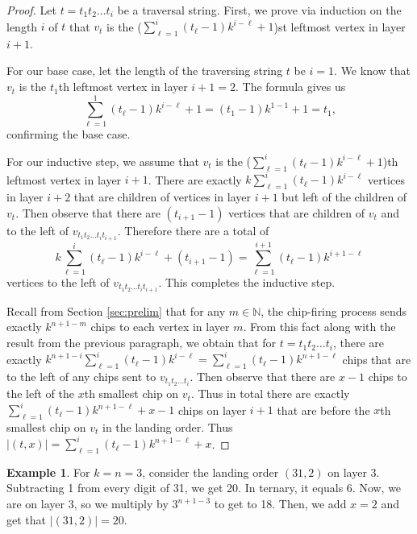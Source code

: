 \documentclass[11pt]{article}
\theoremstyle{definition}
\newtheorem{example}{Example}
\theoremstyle{remark}
\begin{document}
\begin{proof}
    Let $t=t_1t_2\dots t_i$ be a traversal string. First, we prove via induction on the length $i$ of $t$ that $v_{t}$ is the ($\sum_{\ell=1}^i (t_{\ell}-1)k^{i-\ell}+1$)st leftmost vertex in layer $i+1$.

    For our base case, let the length of the traversing string $t$ be $i = 1$. We know that $v_{t}$ is the $t_1$th leftmost vertex in layer $i+1=2$. The formula gives us
    \[\sum_{\ell=1}^1 (t_{\ell}-1)k^{i-\ell}+1 = (t_1 - 1)k^{1-1}+1 = t_1,\] confirming the base case.
    
    For our inductive step, we assume that $v_{t}$ is the ($\sum_{\ell=1}^i (t_{\ell}-1)k^{i-\ell}+1$)th leftmost vertex in layer $i+1$. There are exactly $k\sum_{\ell=1}^i (t_{\ell}-1)k^{i-\ell}$ vertices in layer $i+2$ that are children of vertices in layer $i+1$ but left of the children of $v_{t}$. Then observe that there are $(t_{i+1}-1)$ vertices that are children of $v_{t}$ and to the left of $v_{t_1t_2\dots t_it_{i+1}}$. Therefore there are a total of \[k\sum_{\ell=1}^i (t_{\ell}-1)k^{i-\ell} + (t_{i+1}-1) = \sum_{\ell=1}^{i+1} (t_{\ell}-1)k^{i+1-\ell}\]
    vertices to the left of $v_{t_1t_2\dots t_it_{i+1}}$. This completes the inductive step.

    Recall from Section \ref{sec:prelim} that for any $m \in \mathbb{N}$, the chip-firing process sends exactly $k^{n+1-m}$ chips to each vertex in layer $m$. From this fact along with the result from the previous paragraph, we obtain that for $t = t_1t_2\dots t_i$, there are exactly $k^{n+1-i}\sum_{\ell=1}^i(t_{\ell}-1)k^{i-\ell} = \sum_{\ell=1}^i (t_{\ell}-1)k^{n+1-\ell}$ chips that are to the left of any chips sent to $v_{t_1t_2\dots t_i}$. Then observe that there are $x-1$ chips to the left of the $x$th smallest chip on $v_t$. Thus in total there are exactly $\sum_{\ell=1}^i (t_{\ell}-1)k^{n+1-\ell}+x-1$ chips on layer $i+1$ that are before the $x$th smallest chip on $v_t$ in the landing order. Thus $|(t, x)| = \sum_{\ell=1}^i (t_{\ell}-1)k^{n+1-\ell}+x$.
\end{proof}

\begin{example}
    For $k=n=3$, consider the landing order $(31,2)$ on layer 3. Subtracting 1 from every digit of 31, we get 20. In ternary, it equals 6. Now, we are on layer 3, so we multiply by $3^{n+1-3}$ to get to 18. Then, we add $x=2$ and get that $|(31,2)| = 20$.
\end{example}
\end{document}
